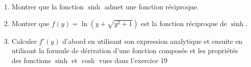 
\begin{exercice}\label{exoanalyseCTU-0102}
    
    \begin{enumerate}
      \item Montrer que la fonction $\sinh$ admet une fonction réciproque. 
      \item Montrer que $f(y) = \ln(y + \sqrt{y^2+1})$ est la fonction réciproque de $\sinh$.
      \item Calculer $f'(y)$ d'abord en utilisant son expression analytique et ensuite en utilisant la formule de dérivation d'une fonction composée et les propriétés des fonctions $\sinh$ et $\cosh$ vues dans l'exercice 19
    \end{enumerate}

\end{exercice}
